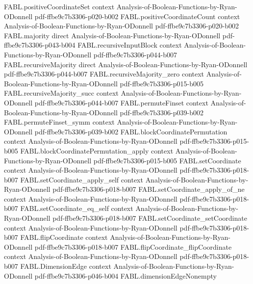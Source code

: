 \begin{theorem}
  {FABL.positiveCoordinateSet}
  {context}
  {Analysis-of-Boolean-Functions-by-Ryan-ODonnell}
  {pdf-ffbe9c7b3306-p020-b002}
\proofstep
  {FABL.positiveCoordinateCount}
  {context}
  {Analysis-of-Boolean-Functions-by-Ryan-ODonnell}
  {pdf-ffbe9c7b3306-p020-b002}
\proofstep
  {FABL.majority}
  {direct}
  {Analysis-of-Boolean-Functions-by-Ryan-ODonnell}
  {pdf-ffbe9c7b3306-p043-b004}
\proofstep
  {FABL.recursiveInputBlock}
  {context}
  {Analysis-of-Boolean-Functions-by-Ryan-ODonnell}
  {pdf-ffbe9c7b3306-p044-b007}
\proofstep
  {FABL.recursiveMajority}
  {direct}
  {Analysis-of-Boolean-Functions-by-Ryan-ODonnell}
  {pdf-ffbe9c7b3306-p044-b007}
\proofstep
  {FABL.recursiveMajority_zero}
  {context}
  {Analysis-of-Boolean-Functions-by-Ryan-ODonnell}
  {pdf-ffbe9c7b3306-p015-b005}
\proofstep
  {FABL.recursiveMajority_succ}
  {context}
  {Analysis-of-Boolean-Functions-by-Ryan-ODonnell}
  {pdf-ffbe9c7b3306-p044-b007}
\proofstep
  {FABL.permuteFinset}
  {context}
  {Analysis-of-Boolean-Functions-by-Ryan-ODonnell}
  {pdf-ffbe9c7b3306-p039-b002}
\proofstep
  {FABL.permuteFinset_symm}
  {context}
  {Analysis-of-Boolean-Functions-by-Ryan-ODonnell}
  {pdf-ffbe9c7b3306-p039-b002}
\proofstep
  {FABL.blockCoordinatePermutation}
  {context}
  {Analysis-of-Boolean-Functions-by-Ryan-ODonnell}
  {pdf-ffbe9c7b3306-p015-b005}
\proofstep
  {FABL.blockCoordinatePermutation_apply}
  {context}
  {Analysis-of-Boolean-Functions-by-Ryan-ODonnell}
  {pdf-ffbe9c7b3306-p015-b005}
\proofstep
  {FABL.setCoordinate}
  {context}
  {Analysis-of-Boolean-Functions-by-Ryan-ODonnell}
  {pdf-ffbe9c7b3306-p018-b007}
\proofstep
  {FABL.setCoordinate_apply_self}
  {context}
  {Analysis-of-Boolean-Functions-by-Ryan-ODonnell}
  {pdf-ffbe9c7b3306-p018-b007}
\proofstep
  {FABL.setCoordinate_apply_of_ne}
  {context}
  {Analysis-of-Boolean-Functions-by-Ryan-ODonnell}
  {pdf-ffbe9c7b3306-p018-b007}
\proofstep
  {FABL.setCoordinate_eq_self}
  {context}
  {Analysis-of-Boolean-Functions-by-Ryan-ODonnell}
  {pdf-ffbe9c7b3306-p018-b007}
\proofstep
  {FABL.setCoordinate_setCoordinate}
  {context}
  {Analysis-of-Boolean-Functions-by-Ryan-ODonnell}
  {pdf-ffbe9c7b3306-p018-b007}
\proofstep
  {FABL.flipCoordinate}
  {context}
  {Analysis-of-Boolean-Functions-by-Ryan-ODonnell}
  {pdf-ffbe9c7b3306-p018-b007}
\proofstep
  {FABL.flipCoordinate_flipCoordinate}
  {context}
  {Analysis-of-Boolean-Functions-by-Ryan-ODonnell}
  {pdf-ffbe9c7b3306-p018-b007}
\proofstep
  {FABL.DimensionEdge}
  {context}
  {Analysis-of-Boolean-Functions-by-Ryan-ODonnell}
  {pdf-ffbe9c7b3306-p046-b004}
\proofstep
  {FABL.dimensionEdgeNonempty}

\end{theorem}
